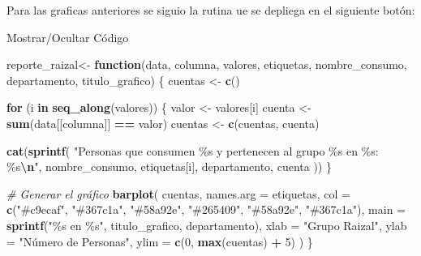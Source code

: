 \documentclass[
]{article}
\newenvironment{Shaded}{\begin{snugshade}}{\end{snugshade}}
\newcommand{\AttributeTok}[1]{\textcolor[rgb]{0.13,0.29,0.53}{#1}}
\newcommand{\CommentTok}[1]{\textcolor[rgb]{0.56,0.35,0.01}{\textit{#1}}}
\newcommand{\ControlFlowTok}[1]{\textcolor[rgb]{0.13,0.29,0.53}{\textbf{#1}}}
\newcommand{\DecValTok}[1]{\textcolor[rgb]{0.00,0.00,0.81}{#1}}
\newcommand{\FunctionTok}[1]{\textcolor[rgb]{0.13,0.29,0.53}{\textbf{#1}}}
\newcommand{\NormalTok}[1]{#1}
\newcommand{\OtherTok}[1]{\textcolor[rgb]{0.56,0.35,0.01}{#1}}
\newcommand{\SpecialCharTok}[1]{\textcolor[rgb]{0.81,0.36,0.00}{\textbf{#1}}}
\newcommand{\StringTok}[1]{\textcolor[rgb]{0.31,0.60,0.02}{#1}}
\begin{document}
Para las graficas anteriores se siguio la rutina ue se depliega en el
siguiente botón:

Mostrar/Ocultar Código

\label{section8}
\begin{Shaded}
\begin{Highlighting}[]
\NormalTok{reporte\_raizal}\OtherTok{\textless{}{-}} \ControlFlowTok{function}\NormalTok{(data, columna, valores, etiquetas, nombre\_consumo, departamento, titulo\_grafico) \{}
\NormalTok{  cuentas }\OtherTok{\textless{}{-}} \FunctionTok{c}\NormalTok{()}
  
  \ControlFlowTok{for}\NormalTok{ (i }\ControlFlowTok{in} \FunctionTok{seq\_along}\NormalTok{(valores)) \{}
\NormalTok{    valor }\OtherTok{\textless{}{-}}\NormalTok{ valores[i]}
\NormalTok{    cuenta }\OtherTok{\textless{}{-}} \FunctionTok{sum}\NormalTok{(data[[columna]] }\SpecialCharTok{==}\NormalTok{ valor)}
\NormalTok{    cuentas }\OtherTok{\textless{}{-}} \FunctionTok{c}\NormalTok{(cuentas, cuenta)}
    
    \FunctionTok{cat}\NormalTok{(}\FunctionTok{sprintf}\NormalTok{(}
      \StringTok{"Personas que consumen \%s y pertenecen al grupo \%s en \%s: \%s}\SpecialCharTok{\textbackslash{}n}\StringTok{"}\NormalTok{, }
\NormalTok{      nombre\_consumo, etiquetas[i], departamento, cuenta}
\NormalTok{    ))}
\NormalTok{  \}}
  
  \CommentTok{\# Generar el gráfico}
  \FunctionTok{barplot}\NormalTok{(}
\NormalTok{    cuentas,}
    \AttributeTok{names.arg =}\NormalTok{ etiquetas,}
    \AttributeTok{col =} \FunctionTok{c}\NormalTok{(}\StringTok{"\#c9ecaf"}\NormalTok{, }\StringTok{"\#367c1a"}\NormalTok{, }\StringTok{"\#58a92e"}\NormalTok{, }\StringTok{"\#265409"}\NormalTok{, }\StringTok{"\#58a92e"}\NormalTok{, }\StringTok{"\#367c1a"}\NormalTok{),}
    \AttributeTok{main =} \FunctionTok{sprintf}\NormalTok{(}\StringTok{"\%s en \%s"}\NormalTok{, titulo\_grafico, departamento),}
    \AttributeTok{xlab =} \StringTok{"Grupo Raizal"}\NormalTok{,}
    \AttributeTok{ylab =} \StringTok{"Número de Personas"}\NormalTok{,}
    \AttributeTok{ylim =} \FunctionTok{c}\NormalTok{(}\DecValTok{0}\NormalTok{, }\FunctionTok{max}\NormalTok{(cuentas) }\SpecialCharTok{+} \DecValTok{5}\NormalTok{)}
\NormalTok{  )}
\NormalTok{\}}


\end{Highlighting}
\end{Shaded}
\end{document}
